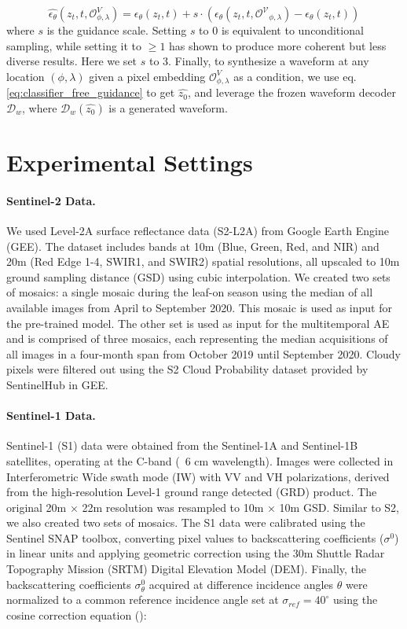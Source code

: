 \begin{equation}
    \label{eq:classifier_free_guidance}
    \hat{\epsilon_\theta}(z_t,t,\mathcal{O}^V_{\phi,\lambda}) = \epsilon_\theta(z_t,t) + s\cdot(\epsilon_\theta(z_t,t,\mathcal{O^V}_{\phi,\lambda})-\epsilon_\theta(z_t,t)) 
\end{equation}
where $s$ is the guidance scale. Setting $s$ to 0 is equivalent to unconditional sampling, while setting it to $\geq 1$ has shown to produce more coherent but less diverse results. Here we set $s$ to 3.
Finally, to synthesize a waveform at any location $(\phi,\lambda)$ given a pixel embedding $\mathcal{O}^V_{\phi,\lambda}$ as a condition, we use eq. \ref{eq:classifier_free_guidance} to get $\hat{z_0}$, and leverage the frozen waveform decoder $\mathcal{D}_w$, where $\mathcal{D}_w(\hat{z_0})$ is a generated waveform.

\section{Experimental Settings}\label{appendix:experimental_settings}

\paragraph{Sentinel-2 Data.} We used Level-2A surface reflectance data (S2-L2A) from Google Earth Engine (GEE). The dataset includes bands at 10m (Blue, Green, Red, and NIR) and 20m (Red Edge 1-4, SWIR1, and SWIR2) spatial resolutions, all upscaled to 10m ground sampling distance (GSD) using cubic interpolation. We created two sets of mosaics: a single mosaic during the leaf-on season using the median of all available images from April to September 2020. This mosaic is used as input for the pre-trained model. The other set is used as input for the multitemporal AE and is comprised of three mosaics, each representing the median acquisitions of all images in a four-month span from October 2019 until September 2020. Cloudy pixels were filtered out using the S2 Cloud Probability dataset provided by SentinelHub in GEE.

\paragraph{Sentinel-1 Data.} Sentinel-1 (S1) data were obtained from the Sentinel-1A and Sentinel-1B satellites, operating at the C-band (~6 cm wavelength). Images were collected in Interferometric Wide swath mode (IW) with VV and VH polarizations, derived from the high-resolution Level-1 ground range detected (GRD) product. The original 20m × 22m resolution was resampled to 10m × 10m GSD. Similar to S2, we also created two sets of mosaics. The S1 data were calibrated using the Sentinel SNAP toolbox, converting pixel values to backscattering coefficients ($\sigma^0$) in linear units and applying geometric correction using the 30m Shuttle Radar Topography Mission (SRTM) Digital Elevation Model (DEM). Finally, the backscattering coefficients $\sigma_\theta^0$ acquired at difference incidence angles $\theta$ were normalized to a common reference incidence angle set at $\sigma_{ref} = 40^\circ$ using the cosine correction equation (\citet{Baghdadi2001,TopouzelisSinghaKitsiou}):

